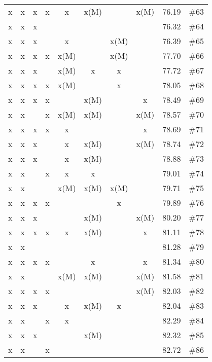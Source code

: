 \begin{longtable}{|c|c|c|c|c|c|c|c|c|c|}
 x    & x    & x    & x    & x    & x(M) &      & x(M) & 76.19 & \#63 \\
 x    & x    & x    &      &      &      &      &      & 76.32 & \#64 \\
 x    & x    & x    &      & x    &      & x(M) &      & 76.39 & \#65 \\
 x    & x    & x    & x    & x(M) &      & x(M) &      & 77.70 & \#66 \\
 x    & x    & x    &      & x(M) & x    & x    &      & 77.72 & \#67 \\
 x    & x    & x    & x    & x(M) &      & x    &      & 78.05 & \#68 \\
 x    & x    & x    & x    &      & x(M) &      & x    & 78.49 & \#69 \\
 x    & x    &      & x    & x(M) & x(M) &      & x(M) & 78.57 & \#70 \\
 x    & x    & x    & x    & x    &      &      & x    & 78.69 & \#71 \\
 x    & x    & x    &      & x    & x(M) &      & x(M) & 78.74 & \#72 \\
 x    & x    & x    &      & x    & x(M) &      &      & 78.88 & \#73 \\
 x    & x    &      & x    & x    & x    &      &      & 79.01 & \#74 \\
 x    & x    &      &      & x(M) & x(M) & x(M) &      & 79.71 & \#75 \\
 x    & x    & x    & x    &      &      & x    &      & 79.89 & \#76 \\
 x    & x    & x    &      &      & x(M) &      & x(M) & 80.20 & \#77 \\
 x    & x    & x    & x    & x    & x(M) &      & x    & 81.11 & \#78 \\
 x    & x    &      &      &      &      &      &      & 81.28 & \#79 \\
 x    & x    & x    & x    &      & x    &      & x    & 81.34 & \#80 \\
 x    & x    &      &      & x(M) & x(M) &      & x(M) & 81.58 & \#81 \\
 x    & x    & x    & x    &      &      &      & x(M) & 82.03 & \#82 \\
 x    & x    & x    &      & x    & x(M) & x    &      & 82.04 & \#83 \\
 x    & x    &      & x    & x    &      &      &      & 82.29 & \#84 \\
 x    & x    & x    &      &      & x(M) &      &      & 82.32 & \#85 \\
 x    & x    &      & x    &      &      &      &      & 82.72 & \#86 \\

\end{longtable}
